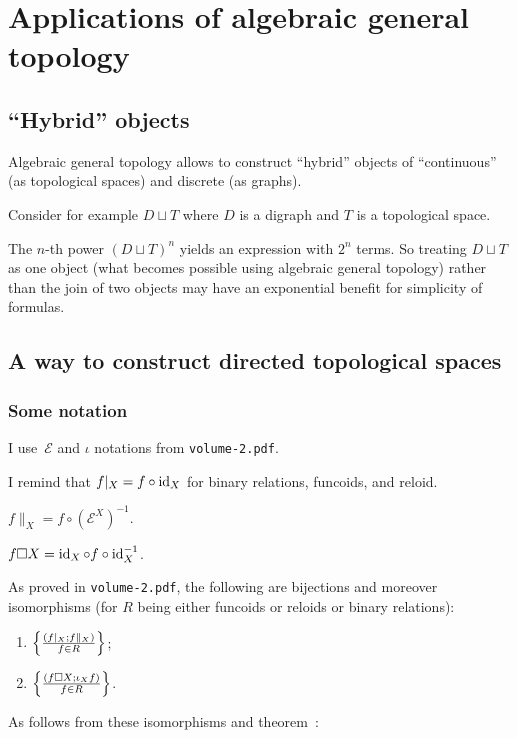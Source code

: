 \chapter{Applications of algebraic general topology}

\section{``Hybrid'' objects}

Algebraic general topology allows to construct ``hybrid'' objects of ``continuous'' (as topological spaces)
and discrete (as graphs).

Consider for example $D\sqcup T$ where $D$ is a digraph and $T$ is a topological space.

The $n$-th power $(D\sqcup T)^n$ yields an expression with $2^n$ terms.
So treating $D\sqcup T$ as one object (what becomes possible using algebraic general topology)
rather than the join of two objects may have an exponential benefit for simplicity of formulas.

\section{A way to construct directed topological spaces}

\subsection{Some notation}

I use~$\mathcal{E}$ and $\iota$ notations from {\tt volume-2.pdf}. 

I remind that $f|_X = f\circ \operatorname{id}_X$ for binary relations, funcoids, and reloid.

$f\parallel_X = f\circ(\mathcal{E}^X)^{-1}$.

$f\square X = \operatorname{id}_X\circ f\circ\operatorname{id}_X^{-1}$.

As proved in {\tt volume-2.pdf}, the following are bijections and moreover isomorphisms (for $R$ being either funcoids or reloids or binary relations):
\begin{enumerate}
\item $\left\{ \frac{(f|_X;f\parallel_X)}{f\in R}\right\}$;
\item $\left\{ \frac{(f\square X;\iota_X f)}{f\in R}\right\}$.
\end{enumerate}

As follows from these isomorphisms and theorem~:

